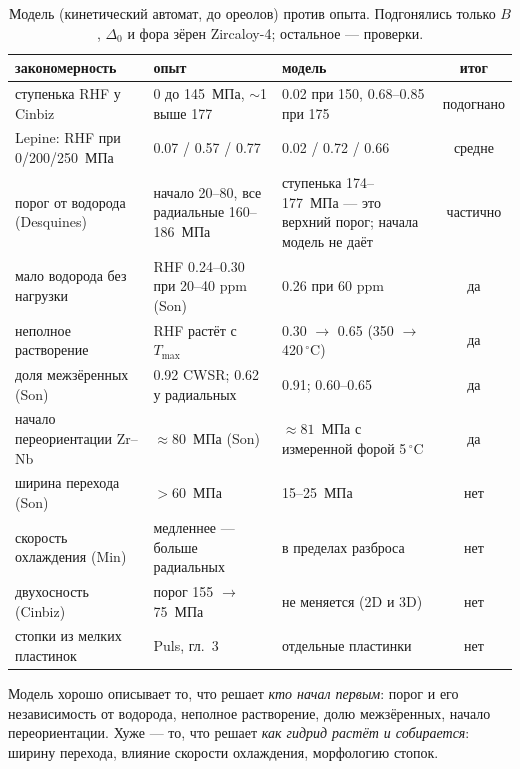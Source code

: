 \begin{table}[htbp]\centering\small
\caption{Модель (кинетический автомат, до ореолов) против опыта. Подгонялись только $B$, $\Delta_0$
и фора зёрен Zircaloy-4; остальное --- проверки.}\label{tab:checks}
\begin{tabularx}{\linewidth}{>{\raggedright}p{4.0cm}>{\raggedright}p{3.5cm}>{\raggedright}X c}\toprule
закономерность & опыт & модель & итог\\\midrule
ступенька RHF у Cinbiz & 0 до 145~МПа, $\sim$1 выше 177 & 0.02 при 150, 0.68--0.85 при 175 & подогнано\\
Lepine: RHF при 0/200/250~МПа & 0.07 / 0.57 / 0.77 & 0.02 / 0.72 / 0.66 & средне\\
порог от водорода (Desquines) & начало 20--80, все радиальные 160--186~МПа & ступенька 174--177~МПа --- это верхний порог; начала модель не даёт & \textcolor{rad}{частично}\\
мало водорода без нагрузки & RHF 0.24--0.30 при 20--40 ppm (Son) & 0.26 при 60 ppm & \textcolor{hydr}{да}\\
неполное растворение & RHF растёт с $T_{\max}$ & 0.30 $\to$ 0.65 (350 $\to$ 420\,$^\circ$C) & \textcolor{hydr}{да}\\
доля межзёренных (Son) & 0.92 CWSR; 0.62 у радиальных & 0.91; 0.60--0.65 & \textcolor{hydr}{да}\\
начало переориентации Zr--Nb & $\approx80$~МПа (Son) & $\approx81$~МПа с измеренной форой 5\,$^\circ$C & \textcolor{hydr}{да}\\
ширина перехода (Son) & $>60$~МПа & 15--25~МПа & \textcolor{rad}{нет}\\
скорость охлаждения (Min) & медленнее --- больше радиальных & в пределах разброса & \textcolor{rad}{нет}\\
двухосность (Cinbiz) & порог 155 $\to$ 75~МПа & не меняется (2D и 3D) & \textcolor{rad}{нет}\\
стопки из мелких пластинок & Puls, гл.~3 & отдельные пластинки & \textcolor{rad}{нет}\\
\bottomrule
\end{tabularx}
\end{table}

\begin{idea}
Модель хорошо описывает то, что решает \emph{кто начал первым}: порог и его независимость от
водорода, неполное растворение, долю межзёренных, начало переориентации. Хуже --- то, что решает
\emph{как гидрид растёт и собирается}: ширину перехода, влияние скорости охлаждения,
морфологию стопок.
\end{idea}

